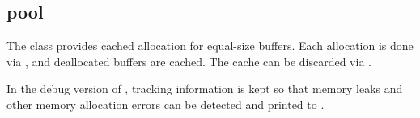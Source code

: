 %
%
%
%
%              

\subsection{pool}
\label{pool}

The  class provides cached allocation for equal-size buffers.
Each allocation is done via , and deallocated buffers are
cached.  The cache can be discarded via .

In the debug version of , tracking information is kept so that
memory leaks and other memory allocation errors can be detected and printed to
.

